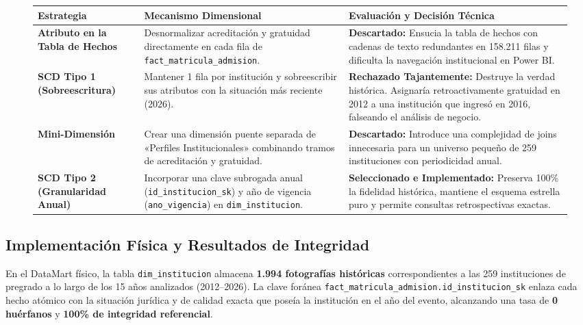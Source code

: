 \documentclass[11pt,a4paper]{article}
\begin{document}
\begin{figure}[h!]
\centering
\begin{tabularx}{\textwidth}{p{3.2cm}Xp{4.2cm}}
\toprule
\textbf{Estrategia} & \textbf{Mecanismo Dimensional} & \textbf{Evaluación y Decisión Técnica} \\
\midrule
\textbf{Atributo en la Tabla de Hechos} & Desnormalizar acreditación y gratuidad directamente en cada fila de \texttt{fact\_matricula\_admision}. & \textcolor{warnred}{\textbf{Descartado:}} Ensucia la tabla de hechos con cadenas de texto redundantes en 158.211 filas y dificulta la navegación institucional en Power BI. \\
\addlinespace
\textbf{SCD Tipo 1 (Sobreescritura)} & Mantener 1 fila por institución y sobreescribir sus atributos con la situación más reciente (2026). & \textcolor{warnred}{\textbf{Rechazado Tajantemente:}} Destruye la verdad histórica. Asignaría retroactivamente gratuidad en 2012 a una institución que ingresó en 2016, falseando el análisis de negocio. \\
\addlinespace
\textbf{Mini-Dimensión} & Crear una dimensión puente separada de «Perfiles Institucionales» combinando tramos de acreditación y gratuidad. & \textcolor{warnred}{\textbf{Descartado:}} Introduce una complejidad de joins innecesaria para un universo pequeño de 259 instituciones con periodicidad anual. \\
\addlinespace
\textbf{SCD Tipo 2 (Granularidad Anual)} & Incorporar una clave subrogada anual (\texttt{id\_institucion\_sk}) y año de vigencia (\texttt{ano\_vigencia}) en \texttt{dim\_institucion}. & \textcolor{okgreen}{\textbf{Seleccionado e Implementado:}} Preserva 100\% la fidelidad histórica, mantiene el esquema estrella puro y permite consultas retrospectivas exactas. \\
\bottomrule
\end{tabularx}
\end{figure}

\subsection{Implementación Física y Resultados de Integridad}
En el DataMart físico, la tabla \texttt{dim\_institucion} almacena \textbf{1.994 fotografías históricas} correspondientes a las 259 instituciones de pregrado a lo largo de los 15 años analizados (2012--2026). La clave foránea \texttt{fact\_matricula\_admision.id\_institucion\_sk} enlaza cada hecho atómico con la situación jurídica y de calidad exacta que poseía la institución en el año del evento, alcanzando una tasa de \textbf{0 huérfanos} y \textbf{100\% de integridad referencial}.
\end{document}
